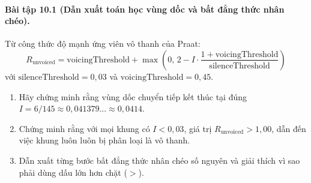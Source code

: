 \paragraph{Bài tập 10.1 (Dẫn xuất toán học vùng dốc và bất đẳng thức nhân chéo).}
Từ công thức độ mạnh ứng viên vô thanh của Praat:
\begin{equation*}
    R_{\text{unvoiced}} = \text{voicingThreshold} + \max\left(0,\, 2 - I \cdot \frac{1 + \text{voicingThreshold}}{\text{silenceThreshold}}\right)
\end{equation*}
với $\text{silenceThreshold} = 0{,}03$ và $\text{voicingThreshold} = 0{,}45$.
\begin{enumerate}[label=(\alph*)]
    \item Hãy chứng minh rằng vùng dốc chuyển tiếp kết thúc tại đúng $I = 6/145 \approx 0{,}041379... \approx 0{,}0414$.
    \item Chứng minh rằng với mọi khung có $I < 0{,}03$, giá trị $R_{\text{unvoiced}} > 1{,}00$, dẫn đến việc khung luôn luôn bị phân loại là vô thanh.
    \item Dẫn xuất từng bước bất đẳng thức nhân chéo số nguyên và giải thích vì sao phải dùng dấu lớn hơn chặt ($>$).
\end{enumerate}

